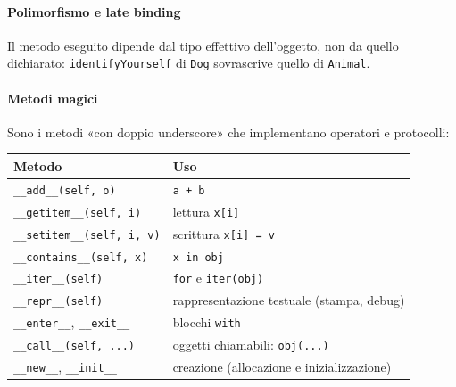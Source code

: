 \documentclass[a4paper,12pt]{article}
\begin{document}
\paragraph{Polimorfismo e late binding} Il metodo eseguito dipende dal tipo effettivo
dell'oggetto, non da quello dichiarato: \texttt{identifyYourself} di \texttt{Dog} sovrascrive
quello di \texttt{Animal}.

\paragraph{Metodi magici} Sono i metodi «con doppio underscore» che implementano operatori e
protocolli:
\begin{center}
\begin{tabular}{|l|l|}
\hline
Metodo & Uso \\
\hline
\texttt{\_\_add\_\_(self, o)} & \texttt{a + b} \\
\texttt{\_\_getitem\_\_(self, i)} & lettura \texttt{x[i]} \\
\texttt{\_\_setitem\_\_(self, i, v)} & scrittura \texttt{x[i] = v} \\
\texttt{\_\_contains\_\_(self, x)} & \texttt{x in obj} \\
\texttt{\_\_iter\_\_(self)} & \texttt{for} e \texttt{iter(obj)} \\
\texttt{\_\_repr\_\_(self)} & rappresentazione testuale (stampa, debug) \\
\texttt{\_\_enter\_\_}, \texttt{\_\_exit\_\_} & blocchi \texttt{with} \\
\texttt{\_\_call\_\_(self, ...)} & oggetti chiamabili: \texttt{obj(...)} \\
\texttt{\_\_new\_\_}, \texttt{\_\_init\_\_} & creazione (allocazione e inizializzazione) \\
\hline
\end{tabular}
\end{center}
\end{document}
